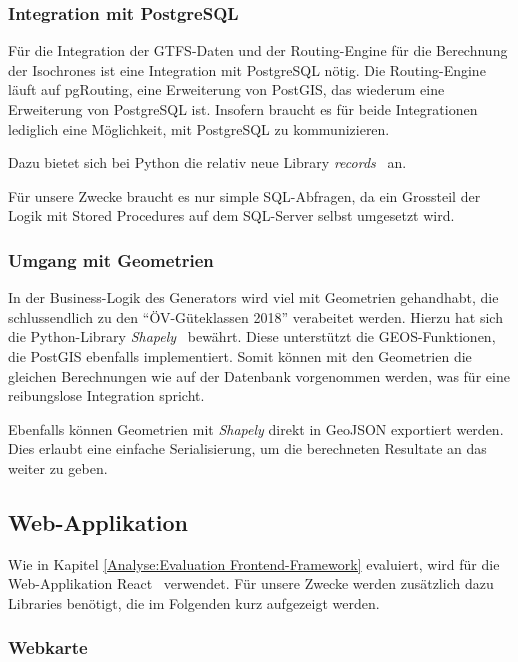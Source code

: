 \subsubsection{Integration mit PostgreSQL}
\label{analyse_generator:Integration mit PostgreSQL}

Für die Integration der GTFS-Daten und der Routing-Engine für die Berechnung der \glspl{Isochrone} ist eine Integration mit PostgreSQL nötig.
Die Routing-Engine läuft auf pgRouting, eine Erweiterung von PostGIS, das wiederum eine Erweiterung von PostgreSQL ist.
Insofern braucht es für beide Integrationen lediglich eine Möglichkeit, mit PostgreSQL zu kommunizieren.

Dazu bietet sich bei Python die relativ neue Library \emph{records}~\cite{records} an.

Für unsere Zwecke braucht es nur simple SQL-Abfragen, da ein Grossteil der Logik mit \glspl{Stored Procedure} auf dem SQL-Server selbst umgesetzt wird.

\subsubsection{Umgang mit Geometrien}
\label{analyse_generator: Umgang mit Geometrien}

In der Business-Logik des Generators wird viel mit Geometrien gehandhabt, die schlussendlich zu den "`ÖV-Güteklassen 2018"' verabeitet werden.
Hierzu hat sich die Python-Library \emph{Shapely}~\cite{shapely} bewährt.
Diese unterstützt die \gls{GEOS}-Funktionen, die PostGIS ebenfalls implementiert.
Somit können mit den Geometrien die gleichen Berechnungen wie auf der Datenbank vorgenommen werden, was für eine reibungslose Integration spricht.

Ebenfalls können Geometrien mit \emph{Shapely} direkt in \gls{GeoJSON} exportiert werden.
Dies erlaubt eine einfache Serialisierung, um die berechneten Resultate an das  weiter zu geben.

\subsection{Web-Applikation}
\label{analyse:Web-Applikation}

Wie in Kapitel \ref{Analyse:Evaluation Frontend-Framework} evaluiert, wird für die Web-Applikation React~\cite{react} verwendet.
Für unsere Zwecke werden zusätzlich dazu Libraries benötigt, die im Folgenden kurz aufgezeigt werden.

\subsubsection{Webkarte}
\label{analyse_webapp:Webkarte}

